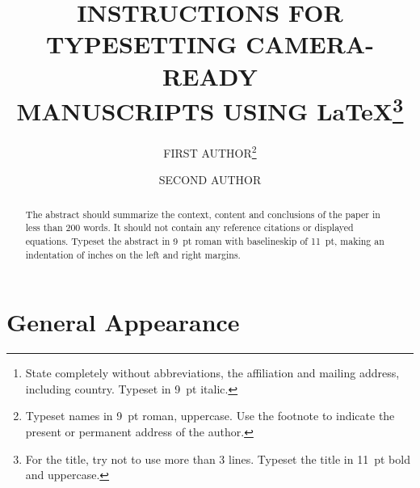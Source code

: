 \documentclass{ws-join}
\begin{document}

\catchline{}{}{}{}{}

\title{INSTRUCTIONS FOR TYPESETTING CAMERA-READY\\
MANUSCRIPTS USING \LaTeX\footnote{For the title, 
try not to use more than 3 lines. Typeset the title in 11~pt bold 
and uppercase.}
}

\author{FIRST AUTHOR\footnote{
Typeset names in 9~pt roman, uppercase. Use the footnote to indicate the
present or permanent address of the author.}}

\address{University Department, University Name, Address\\
City, State ZIP/Zone,Country\,\footnote{State completely without
abbreviations, the affiliation and mailing address,
including country. Typeset in 9~pt italic.}\\
}

\author{SECOND AUTHOR}

\address{Group, Laboratory, Address\\
City, State ZIP/Zone, Country\\
author\_id@domain\_name
}

\maketitle

\begin{history}
\end{history}

\begin{abstract}
The abstract should summarize the context, content
and conclusions of the paper in less than 200 words. It should
not contain any reference citations or displayed equations. Typeset
the abstract in 9~pt roman with baselineskip of 11~pt, making
an indentation of inches on the left and right margins.
\end{abstract}


\section{General Appearance}
\end{document}
